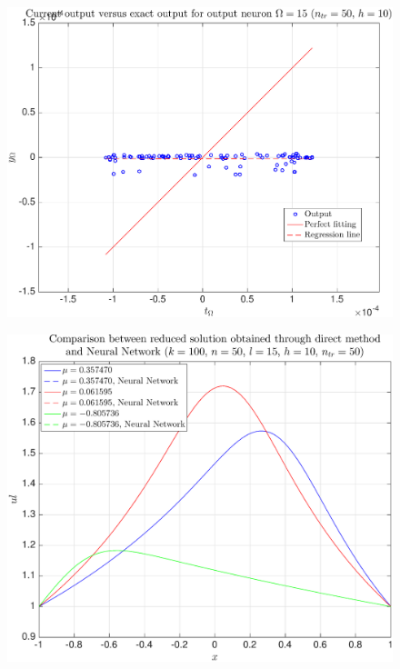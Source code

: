 \documentclass[11pt,a4paper]{article}
\theoremstyle{definition}
\theoremstyle{theorem}
\numberwithin{equation}{section}
\begin{document}
	\begin{figure}[H]
		\center
		\includegraphics[scale = 0.5]{fig32}
		\caption{}
	\end{figure}
	
	\begin{figure}[H]
		\center
		\includegraphics[scale = 0.5]{fig33}
		\caption{}
	\end{figure}
\end{document}
